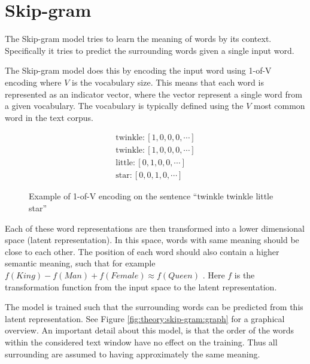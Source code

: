 
\section{Skip-gram}

The Skip-gram model tries to learn the meaning of words by its context. Specifically it tries to predict the surrounding words given a single input word.

The Skip-gram model does this by encoding the input word using 1-of-V encoding where $V$ is the vocabulary size. This means that each word is represented as an indicator vector, where the vector represent a single word from a given vocabulary. The vocabulary is typically defined using the $V$ most common word in the text corpus. 
\begin{figure}[h]
\begin{equation*}
\begin{aligned}
\text{twinkle}: \left[1, 0, 0, 0, \cdots \right] \\
\text{twinkle}: \left[1, 0, 0, 0, \cdots \right] \\
\text{little}: \left[0, 1, 0, 0, \cdots \right] \\
\text{star}: \left[0, 0, 1, 0, \cdots \right]
\end{aligned}
\end{equation*}
\caption{Example of 1-of-V encoding on the sentence ``twinkle twinkle little star''}
\end{figure}

Each of these word representations are then transformed into a lower dimensional space (latent representation). In this space, words with same meaning should be close to each other. The position of each word should also contain a higher semantic meaning, such that for example $f(King) - f(Man) + f(Female) \approx f(Queen)$ \cite{word2vec-comparing}. Here $f$ is the transformation function from the input space to the latent representation.

The model is trained such that the surrounding words can be predicted from this latent representation. See Figure \ref{fig:theory:skip-gram:graph} for a graphical overview. An important detail about this model, is that the order of the words within the considered text window have no effect on the training. Thus all surrounding are assumed to having approximately the same meaning.

